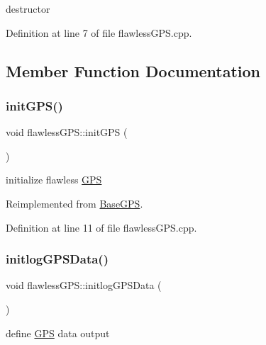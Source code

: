 destructor 



Definition at line 7 of file flawless\+G\+P\+S.\+cpp.



\subsection{Member Function Documentation}
\mbox{\label{classflawless_g_p_s_a50cdffc0dc65e644f6191bc7c723521b}} 
\subsubsection{\texorpdfstring{init\+G\+P\+S()}{initGPS()}}
{\footnotesize\ttfamily void flawless\+G\+P\+S\+::init\+G\+PS (\begin{DoxyParamCaption}{ }\end{DoxyParamCaption})\hspace{0.3cm}{\ttfamily [virtual]}}



initialize flawless \hyperlink{class_g_p_s}{G\+PS} 



Reimplemented from \hyperlink{class_base_g_p_s_a68dbbdd67e5d9de606810377f1cec0e3}{Base\+G\+PS}.



Definition at line 11 of file flawless\+G\+P\+S.\+cpp.

\mbox{\label{classflawless_g_p_s_a6c6e03f68b5c7e8f984419a6d9adbe35}} 
\subsubsection{\texorpdfstring{initlog\+G\+P\+S\+Data()}{initlogGPSData()}}
{\footnotesize\ttfamily void flawless\+G\+P\+S\+::initlog\+G\+P\+S\+Data (\begin{DoxyParamCaption}{ }\end{DoxyParamCaption})}



define \hyperlink{class_g_p_s}{G\+PS} data output 



